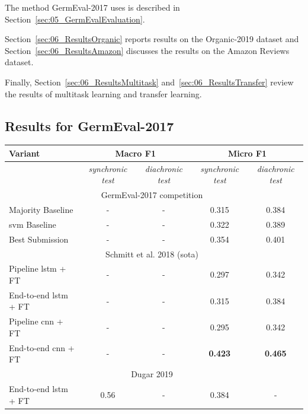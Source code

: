 The method GermEval-2017 uses is described in Section~\ref{sec:05_GermEvalEvaluation}.
\medskip

Section~\ref{sec:06_ResultsOrganic} reports results on the Organic-2019 dataset and Section~\ref{sec:06_ResultsAmazon} discusses the results on the Amazon Reviews dataset.

Finally, Section~\ref{sec:06_ResultsMultitask} and~\ref{sec:06_ResultsTransfer} review the results of multitask learning and transfer learning.

\subsection{Results for GermEval-2017}
\label{sec:06_ResultsGermEval}

\begin{table}[htp]
    \centering
    \begin{tabular*}{\textwidth}{l@{\extracolsep{\fill}}cccc@{}}
    \toprule
    Variant          & \multicolumn{2}{c}{\textbf{Macro F1}}     & \multicolumn{2}{c}{\textbf{Micro F1}}       \\ 
    \midrule
                     & \textit{synchronic test}          & \textit{diachronic test}         & \textit{synchronic test}              & \textit{diachronic test}         \\
    \midrule
                                 \multicolumn{5}{c}{GermEval-2017 competition~\cite{Wojatzki2017}}                     \\
    Majority Baseline                 &  -            &  -        & 0.315            &   0.384                             \\
    \gls{svm} Baseline                 &  -            &  -        & 0.322            &   0.389                             \\
    Best Submission                  &  -             &  -         & 0.354         & 0.401                             \\
    \midrule
                                 \multicolumn{5}{c}{Schmitt et al. 2018 {(\gls{sota})}~\cite{Schmitt2018}}         \\
    Pipeline \gls{lstm} + FT          & -            & -            & 0.297         &   0.342                            \\
    End-to-end \gls{lstm} + FT          & -            & -            & 0.315         &   0.384                             \\
    Pipeline \gls{cnn} + FT          & -            & -            & 0.295         &   0.342                             \\
    End-to-end \gls{cnn} + FT          & -            & -            & \textbf{0.423}&   \textbf{0.465}                     \\
    \midrule
    \multicolumn{5}{c}{Dugar 2019~\cite{Dugar2019}}                                                     \\
    End-to-end \gls{lstm} + FT          & 0.56            & -            &  0.384 &   -                     \\
    \midrule


\end{tabular*}
\end{table}
